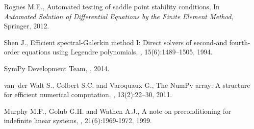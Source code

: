 \documentclass{marine_2015}
\begin{document}
\begin{thebibliography}{16}
Rognes M.E.,
\newblock Automated testing of saddle point stability conditions,
\newblock In {\em Automated Solution of Differential Equations by the Finite
  Element Method}, Springer, 2012.

Shen J.,
\newblock Efficient spectral-Galerkin method I: Direct solvers of second-and
  fourth-order equations using Legendre polynomials,
, 15(6):1489--1505, 1994.

{SymPy Development Team},
, 2014.

van~der Walt S., Colbert S.C. and Varoquaux G.,
\newblock The NumPy array: A structure for efficient numerical computation,
, 13(2):22--30, 2011.

Murphy M.F., Golub G.H. and Wathen A.J.,
\newblock A note on preconditioning for indefinite linear systems,
, 21(6):1969-1972, 1999.

\end{thebibliography}
\end{document}
